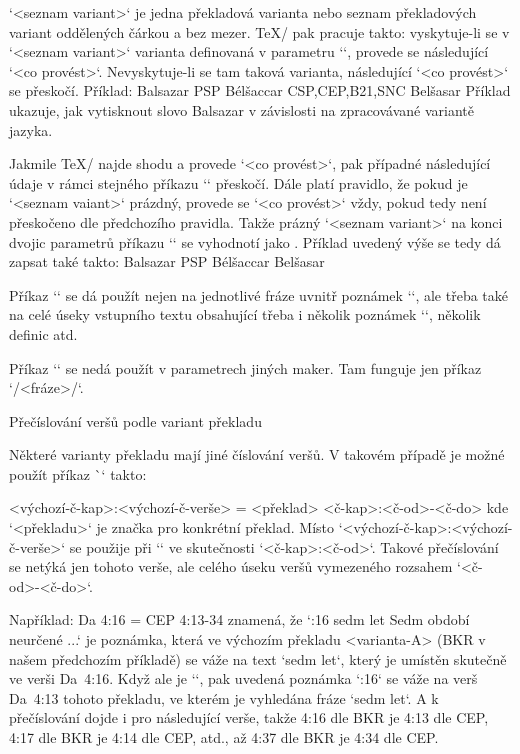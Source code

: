 `<seznam variant>` je
jedna překladová varianta nebo seznam překladových variant oddělených
čárkou a bez mezer. \TeX/ pak pracuje takto: vyskytuje-li
se v `<seznam variant>` varianta definovaná v parametru `\tmark`, provede se
následující `<co provést>`. Nevyskytuje-li se tam taková varianta,
následující `<co provést>` se přeskočí. Příklad:
\begtt
{} {Balsazar}%
        {PSP} {Bélšaccar}%
        {CSP,CEP,B21,SNC} {Belšasar}
\endtt
Příklad ukazuje, jak vytisknout slovo Balsazar v závislosti na
zpracovávané variantě jazyka.

Jakmile \TeX/ najde shodu a provede `<co provést>`, pak případné následující
údaje v rámci stejného příkazu `\switch` přeskočí. Dále platí pravidlo, že
pokud je `<seznam vaiant>` prázdný, provede se `<co provést>` vždy, pokud
tedy není přeskočeno dle předchozího pravidla. Takže prázný `<seznam variant>` na
konci dvojic parametrů příkazu `\switch` se vyhodnotí jako . Příklad uvedený výše se tedy dá zapsat také takto:
\begtt
{} {Balsazar}%
        {PSP} {Bélšaccar}%
        {}    {Belšasar}
\endtt

Příkaz `\switch` se dá použít nejen na jednotlivé fráze uvnitř poznámek
`\Note`, ale třeba také na celé úseky vstupního textu obsahující třeba i
několik poznámek `\Note`, několik definic atd.

Příkaz `\switch` se nedá použít v parametrech jiných maker. Tam funguje jen
příkaz `\x/<fráze>/`.

\secc Přečíslování veršů podle variant překladu

Některé varianty překladu mají jiné číslování veršů. V takovém případě je
možné použít příkaz \`\renum` takto:

\begtt
{} <výchozí-č-kap>:<výchozí-č-verše> = <překlad> <č-kap>:<č-od>-<č-do>
\endtt
kde `<překladu>` je značka pro konkrétní překlad.
Místo `<výchozí-č-kap>:<výchozí-č-verše>` se použije při `\def\tmark{<překlad>}`
ve skutečnosti `<č-kap>:<č-od>`.
Takové přečíslování se netýká jen
tohoto verše, ale celého úseku veršů vymezeného rozsahem `<č-od>-<č-do>`.

Například:
\begtt
\renum Da 4:16 = CEP 4:13-34
\endtt
znamená, že `:16 {sedm let} Sedm období neurčené ...` je poznámka,
která ve výchozím překladu <varianta-A> (BKR v našem předchozím příkladě)
se váže na text `sedm let`, který je umístěn skutečně ve verši Da~4:16.
Když ale je `\def\tmark{CEP}`, pak uvedená poznámka `:16`
se váže na verš Da~4:13 tohoto překladu, ve kterém je vyhledána fráze
`sedm let`. A k přečíslování dojde i pro následující verše, takže
4:16 dle BKR je 4:13 dle CEP, 4:17 dle BKR je 4:14 dle CEP, atd., až
4:37 dle BKR je 4:34 dle CEP.

